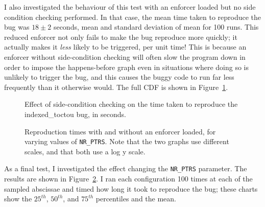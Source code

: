 I also investigated the behaviour of this test with an enforcer loaded
but no side condition checking performed.  In that case, the mean time
taken to reproduce the bug was $18 \pm 2$ seconds, mean and standard
deviation of mean for 100 runs.  This reduced enforcer not only fails
to make the bug reproduce more quickly; it actually makes it
\emph{less} likely to be triggered, per unit time!  This is because an
enforcer without side-condition checking will often slow the program
down in order to impose the happens-before graph even in situations
where doing so is unlikely to trigger the bug, and this causes the
buggy code to run far less frequently than it otherwise would.  The
full CDF is shown in Figure~\ref{fig:eval:indexed_toctou:no_scs}.

\begin{figure}
  
  \caption{Effect of side-condition checking on the time taken to
    reproduce the indexed\_toctou bug, in seconds.}
  \label{fig:eval:indexed_toctou:no_scs}
\end{figure}

\begin{figure}
  \caption{Reproduction times with and without an enforcer loaded, for
    varying values of \texttt{NR\_PTRS}.  Note that the two graphs use
    different scales, and that both use a log y scale.}
  \label{fig:eval:indexed_toctou:nr_ptrs}
\end{figure}

As a final test, I investigated the effect changing the
\texttt{NR\_PTRS} parameter.  The results are shown in
Figure~\ref{fig:eval:indexed_toctou:nr_ptrs}.  I ran each
configuration 100 times at each of the sampled abscissae and timed how
long it took to reproduce the bug; these charts show the $25^{th}$,
$50^{th}$, and $75^{th}$ percentiles and the mean.

